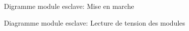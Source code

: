 		\begin{figure}[H]
			\centering
			\caption{Digramme module esclave: Mise en marche}
			\label{fig:diagrammefonctionnelslavemiseenmarche}
		\end{figure}
		
		\begin{figure}[H]
			\centering
			\caption{Diagramme module esclave: Lecture de tension des modules}
			\label{fig:diagrammefonctionnelslavelecturedetension}
		\end{figure}
		
